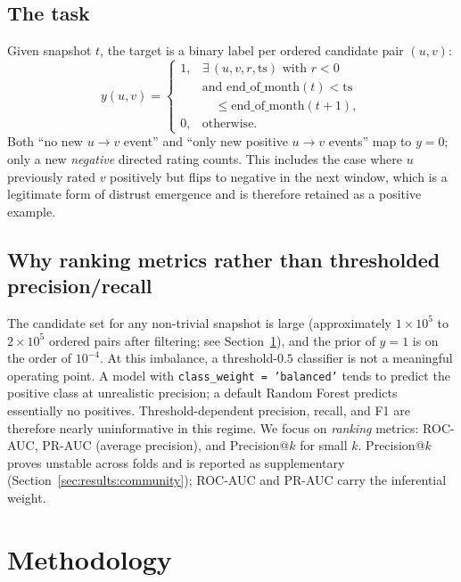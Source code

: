 \documentclass[conference]{IEEEtran}
\newcommand{\code}[1]{\texttt{#1}}
\begin{document}
\subsection{The task}
Given snapshot $t$, the target is a binary label per ordered candidate
pair $(u, v)$:
\begin{equation*}
y(u, v) =
\begin{cases}
1, & \exists\,(u, v, r, \mathrm{ts}) \text{ with } r < 0 \\
   & \text{and } \mathrm{end\_of\_month}(t) < \mathrm{ts} \\
   & \quad\leq \mathrm{end\_of\_month}(t{+}1), \\
0, & \text{otherwise.}
\end{cases}
\end{equation*}
Both ``no new $u \to v$ event'' and ``only new positive $u \to v$
events'' map to $y = 0$; only a new \emph{negative} directed rating
counts. This includes the case where $u$ previously rated $v$
positively but flips to negative in the next window, which is a
legitimate form of distrust emergence and is therefore retained as a
positive example.

\subsection{Why ranking metrics rather than thresholded
precision/recall}
The candidate set for any non-trivial snapshot is large (approximately
$1 \times 10^5$ to $2 \times 10^5$ ordered pairs after filtering;
see Section~\ref{sec:method}), and the prior of $y = 1$ is on the
order of $10^{-4}$. At this imbalance, a threshold-$0.5$ classifier is
not a meaningful operating point. A model with
\code{class\_weight = 'balanced'} tends to predict the positive class
at unrealistic precision; a default Random Forest predicts essentially
no positives. Threshold-dependent precision, recall, and F1 are
therefore nearly uninformative in this regime. We focus on
\emph{ranking} metrics: ROC-AUC, PR-AUC (average precision), and
Precision@$k$ for small $k$. Precision@$k$ proves unstable across
folds and is reported as supplementary
(Section~\ref{sec:results:community}); ROC-AUC and PR-AUC carry the
inferential weight.

\section{Methodology}\label{sec:method}
\end{document}

